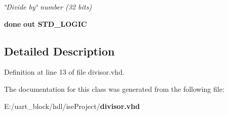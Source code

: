 \begin{DoxyCompactItemize}
\begin{DoxyCompactList}\small\item\em \char`\"{}\-Divide by\char`\"{} number (32 bits) \end{DoxyCompactList}\item 
{\bf done}  {\bfseries {\bfseries out }} {\bfseries S\-T\-D\-\_\-\-L\-O\-G\-I\-C } \label{classdivisor_ab330a3288c5f4fc09ee483ee9426323d}

\end{DoxyCompactItemize}


\subsection{Detailed Description}


Definition at line 13 of file divisor.\-vhd.



The documentation for this class was generated from the following file\-:\begin{DoxyCompactItemize}
\item 
E\-:/uart\-\_\-block/hdl/ise\-Project/{\bf divisor.\-vhd}\end{DoxyCompactItemize}
